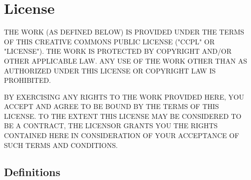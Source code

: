 \chapter{License}
THE WORK (AS DEFINED BELOW) IS PROVIDED UNDER THE TERMS
OF THIS CREATIVE COMMONS PUBLIC LICENSE ("CCPL" OR
"LICENSE"). THE WORK IS PROTECTED BY COPYRIGHT AND/OR OTHER
APPLICABLE LAW. ANY USE OF THE WORK OTHER THAN AS
AUTHORIZED UNDER THIS LICENSE OR COPYRIGHT LAW IS
PROHIBITED.

BY EXERCISING ANY RIGHTS TO THE WORK PROVIDED HERE, YOU
ACCEPT AND AGREE TO BE BOUND BY THE TERMS OF THIS LICENSE.
TO THE EXTENT THIS LICENSE MAY BE CONSIDERED TO BE A
CONTRACT, THE LICENSOR GRANTS YOU THE RIGHTS CONTAINED HERE
IN CONSIDERATION OF YOUR ACCEPTANCE OF SUCH TERMS AND
CONDITIONS.

\section{Definitions}

